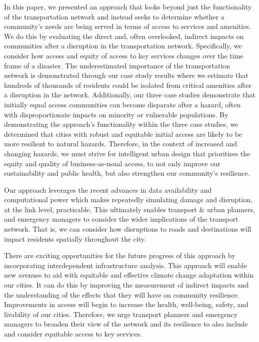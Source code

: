 \documentclass[review,3p,times,onecolumn,sort&compress,12pt]{elsarticle}
\begin{document}
In this paper, we presented an approach that looks beyond just the functionality of the transportation network and instead seeks to determine whether a community's needs are being served in terms of access to services and amenities.
We do this by evaluating the direct and, often overlooked, indirect impacts on communities after a disruption in the transportation network.
Specifically, we consider how access and equity of access to key services changes over the time frame of a disaster.
The underestimated importance of the transportation network is demonstrated through our case study results where we estimate that hundreds of thousands of residents could be isolated from critical amenities after a disruption in the network.
Additionally, our three case studies demonstrate that initially equal access communities can become disparate after a hazard, often with disproportionate impacts on minority or vulnerable populations.
By demonstrating the approach’s functionality within the three case studies, we determined that cities with robust and equitable initial access are likely to be more resilient to natural hazards. 
Therefore, in the context of increased and changing hazards, we must strive for intelligent urban design that prioritises the equity and quality of business-as-usual access, to not only improve our sustainability and public health, but also strengthen our community's resilience. 

Our approach leverages the recent advances in data availability and computational power which makes repeatedly simulating damage and disruption, at the link level, practicable.
This ultimately enables transport \& urban planners, and emergency managers to consider the wider implications of the transport network.
That is, we can consider how disruptions to roads and destinations will impact residents spatially throughout the city.

There are exciting opportunities for the future progress of this approach by incorporating interdependent infrastructure analysis.
This approach will enable new avenues to aid with equitable and effective climate change adaptation within our cities.
It can do this by improving the measurement of indirect impacts and the understanding of the effects that they will have on community resilience.
Improvements in access will begin to increase the health, well-being, safety, and livability of our cities.
Therefore, we urge transport planners and emergency managers to broaden their view of the network and its resilience to also include and consider equitable access to key services.
\end{document}
